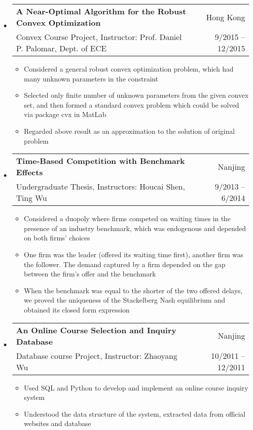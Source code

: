 \documentclass[letterpaper,10pt]{article}
\makeatletter
\newcommand{\resitem}[1]{\item #1 \vspace{-2pt}}
\newcommand{\ressubheading}[4]{
\begin{tabular*}{6.5in}{l@{\extracolsep{\fill}}r}
    \textbf{#1} & #2 \\
    #3 & #4 \\
\end{tabular*}\vspace{-6pt}}
\makeatother
\begin{document}
\begin{itemize}


\item 
\ressubheading{A Near-Optimal Algorithm for the Robust Convex Optimization}{Hong Kong}{Convex Course Project, Instructor: Prof. Daniel P. Palomar, Dept. of ECE}{9/2015 -- 12/2015}
\begin{itemize}
\resitem{Considered a general robust convex optimization problem, which had many unknown parameters in the constraint}
\resitem{Selected only finite number of unknown parameters from the given convex set, and then formed a standard convex problem which could be solved via package cvx in MatLab}
\resitem{Regarded above result as an approximation to the solution of original problem}
\end{itemize}


\item
\ressubheading{Time-Based Competition with Benchmark Effects}{Nanjing}{Undergraduate Thesis, Instructors: Houcai Shen, Ting Wu}{9/2013 -- 6/2014}
\begin{itemize}
\resitem{Considered a duopoly where firms competed on waiting times in the presence of an industry benchmark, which was endogenous and depended on both firms' choices}
\resitem{One firm was the leader (offered its waiting time first), another firm was the follower. The demand captured by a firm depended on the gap between the firm's offer and the benchmark}
\resitem{When the benchmark was equal to the shorter of the two offered delays, we proved the uniqueness of the Stackelberg Nash equilibrium and obtained its closed form expression}
\end{itemize}


\item 
\ressubheading{An Online Course Selection and Inquiry Database}{Nanjing}{Database course Project, Instructor: Zhaoyang Wu}{10/2011 -- 12/2011}
\begin{itemize}
\resitem{Used SQL and Python to develop and implement an online course inquiry system}
\resitem{Understood the data structure of the system, extracted data from official websites and database}
\end{itemize}

\end{itemize}
\end{document}
